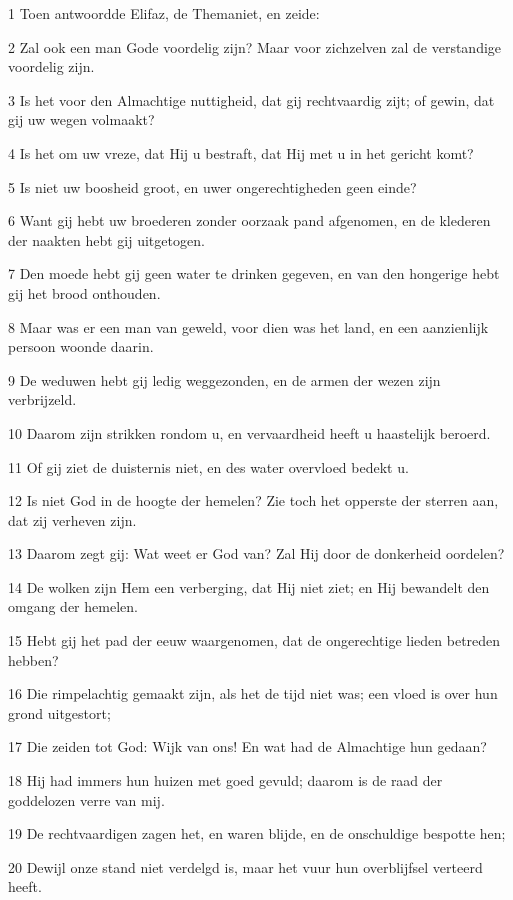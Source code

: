 \par 1 Toen antwoordde Elifaz, de Themaniet, en zeide:
\par 2 Zal ook een man Gode voordelig zijn? Maar voor zichzelven zal de verstandige voordelig zijn.
\par 3 Is het voor den Almachtige nuttigheid, dat gij rechtvaardig zijt; of gewin, dat gij uw wegen volmaakt?
\par 4 Is het om uw vreze, dat Hij u bestraft, dat Hij met u in het gericht komt?
\par 5 Is niet uw boosheid groot, en uwer ongerechtigheden geen einde?
\par 6 Want gij hebt uw broederen zonder oorzaak pand afgenomen, en de klederen der naakten hebt gij uitgetogen.
\par 7 Den moede hebt gij geen water te drinken gegeven, en van den hongerige hebt gij het brood onthouden.
\par 8 Maar was er een man van geweld, voor dien was het land, en een aanzienlijk persoon woonde daarin.
\par 9 De weduwen hebt gij ledig weggezonden, en de armen der wezen zijn verbrijzeld.
\par 10 Daarom zijn strikken rondom u, en vervaardheid heeft u haastelijk beroerd.
\par 11 Of gij ziet de duisternis niet, en des water overvloed bedekt u.
\par 12 Is niet God in de hoogte der hemelen? Zie toch het opperste der sterren aan, dat zij verheven zijn.
\par 13 Daarom zegt gij: Wat weet er God van? Zal Hij door de donkerheid oordelen?
\par 14 De wolken zijn Hem een verberging, dat Hij niet ziet; en Hij bewandelt den omgang der hemelen.
\par 15 Hebt gij het pad der eeuw waargenomen, dat de ongerechtige lieden betreden hebben?
\par 16 Die rimpelachtig gemaakt zijn, als het de tijd niet was; een vloed is over hun grond uitgestort;
\par 17 Die zeiden tot God: Wijk van ons! En wat had de Almachtige hun gedaan?
\par 18 Hij had immers hun huizen met goed gevuld; daarom is de raad der goddelozen verre van mij.
\par 19 De rechtvaardigen zagen het, en waren blijde, en de onschuldige bespotte hen;
\par 20 Dewijl onze stand niet verdelgd is, maar het vuur hun overblijfsel verteerd heeft.
